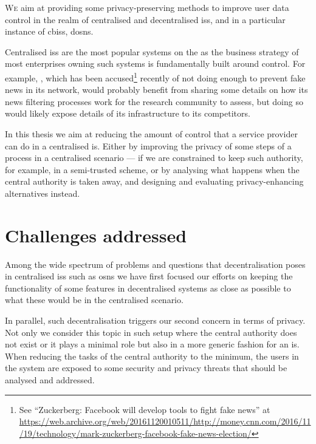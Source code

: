\documentclass[showtrims, oldfontcommands]{kthesis}
\begin{document}

\lettrine{\textcolor[gray]{.25}{W}}{e} aim at providing some privacy-preserving 
methods to improve user data control in the realm of centralised and decentralised 
\acp{is}, and in a particular instance of \acp{cbis}, \acp{dosn}.

Centralised \acp{is} are the most popular systems on the \Internet as the business 
strategy of most enterprises owning such systems is fundamentally built around control. 
For example, \Facebook, which has been accused\footnote{See ``Zuckerberg: Facebook will develop tools to fight fake news'' at \url{https://web.archive.org/web/20161120010511/http://money.cnn.com/2016/11/19/technology/mark-zuckerberg-facebook-fake-news-election/}} 
recently of not doing enough to prevent fake news in its network, would probably 
benefit from sharing some details on how its news filtering processes work for the 
research community to assess, but doing so would likely expose details of its infrastructure 
to its competitors.

In this thesis we aim at reducing the amount of control that a service provider 
can do in a centralised \ac{is}. Either by improving the privacy of some steps of 
a process in a centralised scenario --- if we are constrained to keep such authority, 
for example, in a semi-trusted scheme, or by analysing what happens when the central 
authority is taken away, and designing and evaluating privacy-enhancing alternatives 
instead.

\section{Challenges addressed}
    \label{section:thesis:challenges-addressed}
Among the wide spectrum of problems and questions that decentralisation poses in 
centralised \acp{is} such as \acp{osn} we have first focused our efforts on keeping 
the functionality of some features in decentralised systems as close as possible 
to what these would be in the centralised scenario.

In parallel, such decentralisation triggers our second concern in terms of privacy.
Not only we consider this topic in such setup where the central authority does not 
exist or it plays a minimal role but also in a more generic fashion for an \ac{is}. 
When reducing the tasks of the central authority to the minimum, the users in the 
system are exposed to some security and privacy threats that should be analysed 
and addressed.
\end{document}
